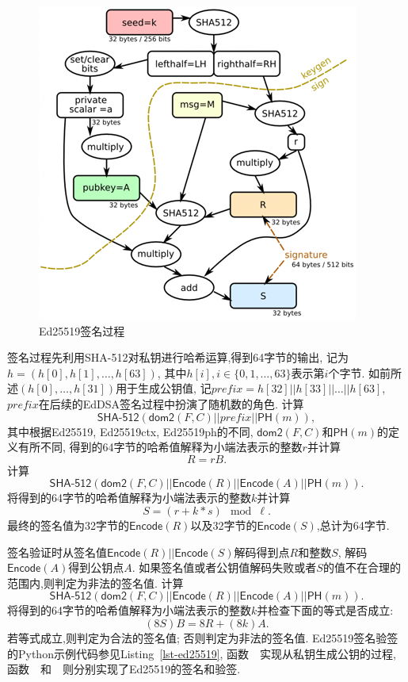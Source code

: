 \begin{figure}[h]
\centering
\includegraphics[width=.7\textwidth]{ed25519.png}
\caption{Ed25519签名过程}\label{fig-ed25519}
\end{figure}

签名过程先利用\textsf{SHA-512}对私钥进行哈希运算,得到64字节的输出,
记为$h = (h[0], h[1], \ldots, h[63])$, 其中$h[i], i \in \{0, 1, \ldots, 63\}$表示第$i$个字节.
如前所述$(h[0], \ldots, h[31])$用于生成公钥值, 记$prefix = h[32] || h[33] || \ldots || h[63]$, 
$prefix$在后续的EdDSA签名过程中扮演了随机数的角色.
计算
$$\textsf{SHA-512}(\textsf{dom2}(F, C) || prefix || \textsf{PH}(m)),$$
其中根据\textsf{Ed25519}, \textsf{Ed25519ctx}, \textsf{Ed25519ph}的不同,
$\textsf{dom2}(F,C)$和$\textsf{PH}(m)$的定义有所不同,
得到的64字节的哈希值解释为小端法表示的整数$r$并计算
$$R = rB.$$
计算
$$\textsf{SHA-512}\left(\textsf{dom2}(F,C) || \textsf{Encode}(R) || \textsf{Encode}(A) || \textsf{PH}(m)\right).$$
将得到的64字节的哈希值解释为小端法表示的整数$k$并计算
$$ S = (r + k * s) \mod \ell.$$
最终的签名值为32字节的$\textsf{Encode}(R)$以及32字节的$\textsf{Encode}(S)$,总计为64字节.

签名验证时从签名值$\textsf{Encode}(R)||\textsf{Encode}(S)$解码得到点$R$和整数$S$,
解码$\textsf{Encode}(A)$得到公钥点$A$.
如果签名值或者公钥值解码失败或者$S$的值不在合理的范围内,则判定为非法的签名值.
计算
$$\textsf{SHA-512}\left(\textsf{dom2}(F,C) || \textsf{Encode}(R) || \textsf{Encode}(A) || \textsf{PH}(m)\right).$$
将得到的64字节的哈希值解释为小端法表示的整数$k$并检查下面的等式是否成立:
$$(8S)B = 8R + (8k)A.$$
若等式成立,则判定为合法的签名值; 否则判定为非法的签名值.
\textsf{Ed25519}签名验签的Python示例代码参见Listing~\ref{lst-ed25519},
函数~~实现从私钥生成公钥的过程,
函数~~和~~则分别实现了Ed25519的签名和验签.

